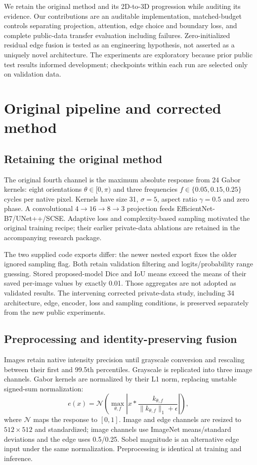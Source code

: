 \documentclass{article}
\begin{document}
We retain the original method and its 2D-to-3D progression while auditing its evidence. Our contributions are an auditable implementation, matched-budget controls separating projection, attention, edge choice and boundary loss, and complete public-data transfer evaluation including failures. Zero-initialized residual edge fusion is tested as an engineering hypothesis, not asserted as a uniquely novel architecture. The experiments are exploratory because prior public test results informed development; checkpoints within each run are selected only on validation data.

\section{Original pipeline and corrected method}
\subsection{Retaining the original method}
The original fourth channel is the maximum absolute response from 24 Gabor kernels: eight orientations $\theta\in[0,\pi)$ and three frequencies $f\in\{0.05,0.15,0.25\}$ cycles per native pixel. Kernels have size 31, $\sigma=5$, aspect ratio $\gamma=0.5$ and zero phase. A convolutional $4\!\to\!16\!\to\!8\!\to\!3$ projection feeds EfficientNet-B7/UNet++/SCSE. Adaptive loss and complexity-based sampling motivated the original training recipe; their earlier private-data ablations are retained in the accompanying research package.

The two supplied code exports differ: the newer nested export fixes the older ignored sampling flag. Both retain validation filtering and logits/probability range guessing. Stored proposed-model Dice and IoU means exceed the means of their saved per-image values by exactly 0.01. Those aggregates are not adopted as validated results. The intervening corrected private-data study, including 34 architecture, edge, encoder, loss and sampling conditions, is preserved separately from the new public experiments.

\subsection{Preprocessing and identity-preserving fusion}
Images retain native intensity precision until grayscale conversion and rescaling between their first and 99.5th percentiles. Grayscale is replicated into three image channels. Gabor kernels are normalized by their L1 norm, replacing unstable signed-sum normalization:
\begin{equation}
 e(x)=\mathcal N\!\left(\max_{\theta,f}\left|x*\frac{k_{\theta,f}}{\|k_{\theta,f}\|_1+\epsilon}\right|\right),
\end{equation}
where $\mathcal N$ maps the response to $[0,1]$. Image and edge channels are resized to $512\times512$ and standardized; image channels use ImageNet means/standard deviations and the edge uses 0.5/0.25. Sobel magnitude is an alternative edge input under the same normalization. Preprocessing is identical at training and inference.
\end{document}
